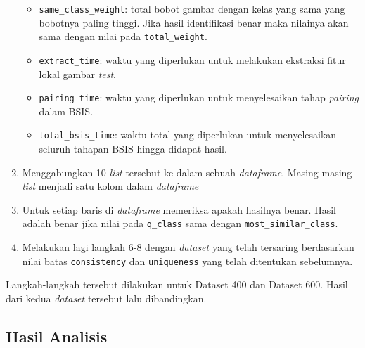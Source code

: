 \begin{enumerate}
\begin{itemize}
		\item \texttt{same\_class\_weight}: total bobot gambar dengan kelas yang sama yang bobotnya paling tinggi. Jika hasil identifikasi benar maka nilainya akan sama dengan nilai pada \texttt{total\_weight}.
		\item \texttt{extract\_time}: waktu yang diperlukan untuk melakukan ekstraksi fitur lokal gambar \textit{test}.
		\item \texttt{pairing\_time}: waktu yang diperlukan untuk menyelesaikan tahap \textit{pairing} dalam BSIS.
		\item \texttt{total\_bsis\_time}: waktu total yang diperlukan untuk menyelesaikan seluruh tahapan BSIS hingga didapat hasil.
	\end{itemize}
	\item Menggabungkan 10 \textit{list} tersebut ke dalam sebuah \textit{dataframe}. Masing-masing \textit{list} menjadi satu kolom dalam \textit{dataframe}
	\item Untuk setiap baris di \textit{dataframe} memeriksa apakah hasilnya benar. Hasil adalah benar jika nilai pada \texttt{q\_class} sama dengan \texttt{most\_similar\_class}. 
	\item Melakukan lagi langkah 6-8 dengan \textit{dataset} yang telah tersaring berdasarkan nilai batas \texttt{consistency} dan \texttt{uniqueness} yang telah ditentukan sebelumnya.
\end{enumerate}
Langkah-langkah tersebut dilakukan untuk Dataset 400 dan Dataset 600. Hasil dari kedua \textit{dataset} tersebut lalu dibandingkan.

\subsection{Hasil Analisis}
